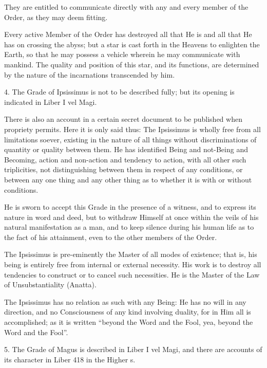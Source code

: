 They are entitled to communicate directly with any and every member of the Order, as they may deem fitting.

Every active Member of the Order has destroyed all that He is and all that He has on crossing the abyss; but a star is cast forth in the Heavens to enlighten the Earth, so that he may possess a vehicle wherein he may communicate with mankind. The quality and position of this star, and its functions, are determined by the nature of the incarnations transcended by him.

\vspace{\baselineskip}

4. The Grade of Ipsissimus is not to be described fully; but its opening is indicated in Liber I vel Magi.

There is also an account in a certain secret document to be published when propriety permits. Here it is only said thus: The Ipsissimus is wholly free from all limitations soever, existing in the nature of all things without discriminations of quantity or quality between them. He has identified Being and not-Being and Becoming, action and non-action and tendency to action, with all other such triplicities, not distinguishing between them in respect of any conditions, or between any one thing and any other thing as to whether it is with or without conditions.

He is sworn to accept this Grade in the presence of a witness, and to express its nature in word and deed, but to withdraw Himself at once within the veils of his natural manifestation as a man, and to keep silence during his human life as to the fact of his attainment, even to the other members of the Order.

The Ipsissimus is pre-eminently the Master of all modes of existence; that is, his being is entirely free from internal or external necessity. His work is to destroy all tendencies to construct or to cancel such necessities. He is the Master of the Law of Unsubstantiality (Anatta).

The Ipsissimus has no relation as such with any Being: He has no will in any direction, and no Consciousness of any kind involving duality, for in Him all is accomplished; as it is written \enquote{beyond the Word and the Fool, yea, beyond the Word and the Fool}.

\vspace{\baselineskip}

5. The Grade of Magus is described in Liber I vel Magi, and there are accounts of its character in Liber 418 in the Higher \AEthyr{}s.

